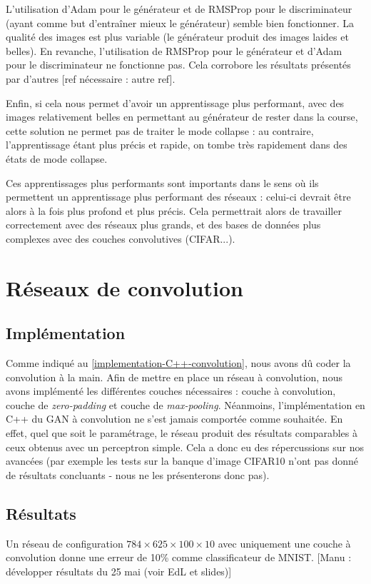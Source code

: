 L’utilisation d’Adam pour le générateur et de RMSProp pour le discriminateur (ayant comme but d'entraîner mieux le générateur) semble bien fonctionner. La qualité des images est plus variable (le générateur produit des images laides et belles).
En revanche, l'utilisation de RMSProp pour le générateur et d'Adam pour le discriminateur ne fonctionne pas. Cela corrobore les résultats présentés par d'autres \cite{auriau_apprentissage_2017}[ref nécessaire : autre ref].

Enfin, si cela nous permet d'avoir un apprentissage plus performant, avec des images relativement belles en permettant au générateur de rester dans la course, cette solution ne permet pas de traiter le mode collapse : au contraire, l'apprentissage étant plus précis et rapide, on tombe très rapidement dans des états de mode collapse.

Ces apprentissages plus performants sont importants dans le sens où ils permettent un apprentissage plus performant des réseaux : celui-ci devrait être alors à la fois plus profond et plus précis. Cela permettrait alors de travailler correctement avec des réseaux plus grands, et des bases de données plus complexes avec des couches convolutives (CIFAR...).

\section{Réseaux de convolution}
\label{DCGAN}
\subsection{Implémentation}
Comme indiqué au \ref{implementation-C++-convolution}, nous avons dû coder la convolution à la main.
Afin de mettre en place un réseau à convolution, nous avons implémenté les différentes couches nécessaires : couche à convolution, couche de \textit{zero-padding} et couche de \textit{max-pooling}.
Néanmoins, l'implémentation en C++ du GAN à convolution ne s'est jamais comportée comme souhaitée. En effet, quel que soit le paramétrage, le réseau produit des résultats comparables à ceux obtenus avec un perceptron simple. Cela a donc eu des répercussions sur nos avancées (par exemple les tests sur la banque d'image CIFAR10 n'ont pas donné de résultats concluants - nous ne les présenterons donc pas).

\subsection{Résultats}
Un réseau de configuration $784 \times 625 \times 100 \times 10$ avec uniquement une couche à convolution donne une erreur de 10\% comme classificateur de MNIST. [Manu : développer résultats du 25 mai (voir EdL et slides)]

